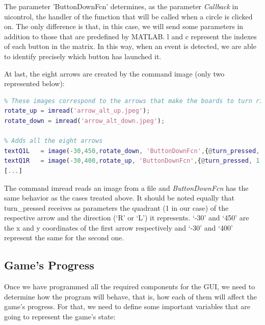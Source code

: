 \vspace{10pt}

The parameter 'ButtonDownFcn' determines, as the parameter \textit{Callback} in
uicontrol,  the handler of the function that will be called when a circle is
clicked on. The only difference is that, in this case, we will send some
parameters in addition to those that are predefined by MATLAB. l and c
represent the indexes of each button in the matrix. In this way, when an event
is detected, we are able to identify precisely which button has launched it.

\vspace{10pt}

At last, the eight arrows are created by the command image (only two
represented below):

\vspace{10pt}

\begin{lstlisting}[language=Matlab]
% The following lines are responsible for reading the images from the respective files.
% These images correspond to the arrows that make the boards to turn right or left.
rotate_up = imread('arrow_alt_up.jpeg');
rotate_down = imread('arrow_alt_down.jpeg');

% Adds all the eight arrows
textQ1L   = image(-30,450,rotate_down, 'ButtonDownFcn',{@turn_pressed, 1, 'R'});
textQ1R   = image(-30,400,rotate_up, 'ButtonDownFcn',{@turn_pressed, 1, 'L'});
[...]
\end{lstlisting}

\vspace{10pt}

The command imread reads an image from a file and \textit{ButtonDownFcn} has the
same behavior as the cases treated above. It should be noted equally that
turn\_pressed receives as parameters the quadrant (1 in our case) of the
respective arrow and the direction (‘R’ or ‘L’) it represents. ‘-30’ and ‘450’
are the x and y coordinates of the first arrow respectively and ‘-30’ and ‘400’
represent the same for the second one.

\subsection{Game’s Progress}

Once we have programmed all the required components for the GUI, we need to
determine how the program will behave, that is, how each of them will affect
the game’s progress. For that, we need to define some important variables that
are going to represent the game’s state:

